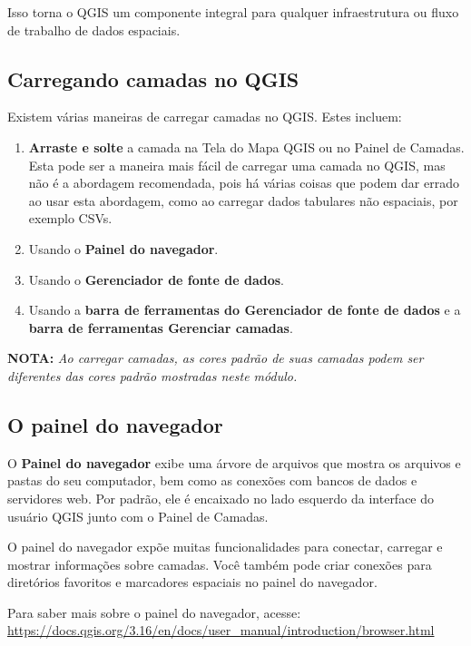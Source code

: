 \documentclass[
]{krantz}
\providecommand{\tightlist}{%
  \setlength{\itemsep}{0pt}\setlength{\parskip}{0pt}}
\begin{document}
Isso torna o QGIS um componente integral para qualquer infraestrutura ou fluxo de trabalho de dados espaciais.

\hypertarget{carregando-camadas-no-qgis}{%
\subsection{Carregando camadas no QGIS}\label{carregando-camadas-no-qgis}}

Existem várias maneiras de carregar camadas no QGIS. Estes incluem:

\begin{enumerate}
\def\labelenumi{\arabic{enumi}.}
\tightlist
\item
  \textbf{Arraste e solte} a camada na Tela do Mapa QGIS ou no Painel de Camadas. Esta pode ser a maneira mais fácil de carregar uma camada no QGIS, mas não é a abordagem recomendada, pois há várias coisas que podem dar errado ao usar esta abordagem, como ao carregar dados tabulares não espaciais, por exemplo CSVs.
\item
  Usando o \textbf{Painel do navegador}.
\item
  Usando o \textbf{Gerenciador de fonte de dados}.
\item
  Usando a \textbf{barra de ferramentas do Gerenciador de fonte de dados} e a \textbf{barra de ferramentas Gerenciar camadas}.
\end{enumerate}

\textbf{NOTA:} \emph{Ao carregar camadas, as cores padrão de suas camadas podem ser diferentes das cores padrão mostradas neste módulo.}

\hypertarget{o-painel-do-navegador}{%
\subsection{O painel do navegador}\label{o-painel-do-navegador}}

O \textbf{Painel do navegador} exibe uma árvore de arquivos que mostra os arquivos e pastas do seu computador, bem como as conexões com bancos de dados e servidores web. Por padrão, ele é encaixado no lado esquerdo da interface do usuário QGIS junto com o Painel de Camadas.

O painel do navegador expõe muitas funcionalidades para conectar, carregar e mostrar informações sobre camadas. Você também pode criar conexões para diretórios favoritos e marcadores espaciais no painel do navegador.

Para saber mais sobre o painel do navegador, acesse: \href{https://docs.qgis.org/3.16/en\%20/docs/user_manual/introduction/browser.html}{https://docs.qgis.org/3.16/en/docs/user\_manual/introduction/browser.html}
\end{document}
